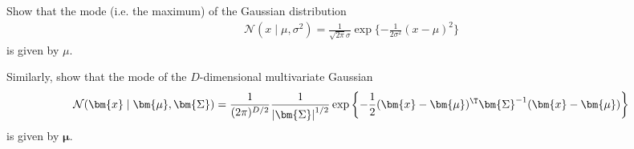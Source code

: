 \begin{question}{1.9}
	Show that the mode (i.e. the maximum) of the Gaussian distribution 
	\begin{align*}
		\mathcal{N}(x \mid \mu, \sigma^2) = \frac{1}{\sqrt{2\pi}\sigma} \exp\{ -\frac{1}{2\sigma^2} (x-\mu)^2 \} 
	\end{align*}
	is given by $\mu$. 
	
	Similarly, show that the mode of the $D$-dimensional multivariate Gaussian 
	\begin{align*}
		\mathcal{N}(\bm{x} \mid \bm{\mu}, \bm{\Sigma}) = \frac{1}{(2\pi)^{D/2}} \frac{1}{\left\lvert \bm{\Sigma} \right\rvert^{1/2}} \exp\left\{ -\frac{1}{2}(\bm{x}-\bm{\mu})^{\T}\bm{\Sigma}^{-1}(\bm{x}-\bm{\mu}) \right\}
	\end{align*} 
	is given by $\bm{\mu}$.
\end{question}

